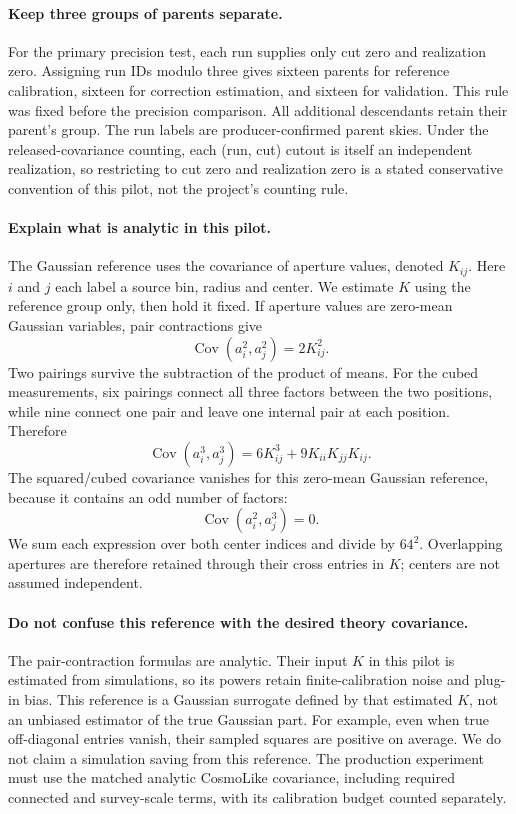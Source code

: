 \documentclass[11pt]{article}
\newcommand{\cov}{\operatorname{Cov}}
\begin{document}
\paragraph{Keep three groups of parents separate.}
For the primary precision test, each run supplies only cut zero and
realization zero. Assigning run IDs modulo three gives sixteen parents for
reference calibration, sixteen for correction estimation, and sixteen for
validation. This rule was fixed before the precision comparison. All
additional descendants retain their parent's group. The run labels are
producer-confirmed parent skies. Under the released-covariance counting,
each (run, cut) cutout is itself an independent realization, so
restricting to cut zero and realization zero is a stated conservative
convention of this pilot, not the project's counting rule.

\paragraph{Explain what is analytic in this pilot.}
The Gaussian reference uses the covariance of aperture values, denoted
$K_{ij}$. Here $i$ and $j$ each label a source bin, radius and center. We
estimate $K$ using the reference group only, then hold it fixed. If aperture
values are zero-mean Gaussian variables, pair contractions give
\begin{equation}
 \cov(a_i^2,a_j^2)=2K_{ij}^2.
\end{equation}
Two pairings survive the subtraction of the product of means. For the
cubed measurements, six pairings connect all three factors between the two
positions, while nine connect one pair and leave one internal pair at each
position. Therefore
\begin{equation}
 \cov(a_i^3,a_j^3)=6K_{ij}^3+9K_{ii}K_{jj}K_{ij}.
\end{equation}
The squared/cubed covariance vanishes for this zero-mean Gaussian reference,
because it contains an odd number of factors:
\begin{equation}
 \cov(a_i^2,a_j^3)=0.
\end{equation}
We sum each expression over both center indices and divide by $64^2$.
Overlapping apertures are therefore retained through their cross entries
in $K$; centers are not assumed independent.

\paragraph{Do not confuse this reference with the desired theory covariance.}
The pair-contraction formulas are analytic. Their input $K$ in this pilot
is estimated from simulations, so its powers retain finite-calibration
noise and plug-in bias. This reference is a Gaussian surrogate defined by
that estimated $K$, not an unbiased estimator of the true Gaussian part.
For example, even when true off-diagonal entries vanish, their sampled
squares are positive on average. We do not claim a simulation saving from
this reference. The production experiment must use the matched analytic
CosmoLike covariance, including required connected and survey-scale terms,
with its calibration budget counted separately.
\end{document}

